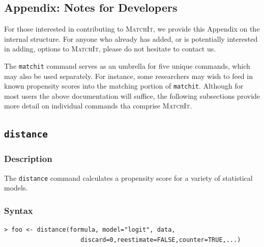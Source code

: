 \documentclass[oneside,letterpaper,titlepage]{article}
\newcommand{\MatchIt}{\textsc{MatchIt}}
\begin{document}
\begin{appendix}
\section{Appendix: Notes for Developers}
\label{reference}  
For those interested in contributing to \MatchIt, we provide this
Appendix on the internal structure.  For anyone who already has added,
or is potentially interested in adding, options to \MatchIt, please do
not hesitate to contact us.

The \texttt{matchit} command serves as an umbrella for five unique
commands, which may also be used separately.  For instance, some
researchers may wish to feed in known propensity scores into the
matching portion of \texttt{matchit}.  Although for most users the
above documentation will suffice, the following subsections provide
more detail on individual commands tha comprise \MatchIt.

\subsection{\texttt{distance}}

\subsubsection{Description}
The \texttt{distance} command calculates a propensity score for a
variety of statistical models. 

\subsubsection{Syntax}
\begin{verbatim}
> foo <- distance(formula, model="logit", data,
                     discard=0,reestimate=FALSE,counter=TRUE,...)
\end{verbatim}


\end{appendix}
\end{document}

